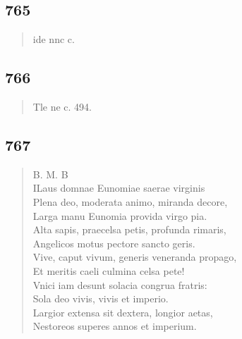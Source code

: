 \documentclass[11pt, a4paper]{report}
\begin{document}
            \subsection*{765}
      \begin{verse}
      ide nnc c. \\ 
      \end{verse}
  
            \subsection*{766}
      \begin{verse}
      Tle ne c. 494. \\ 
      \end{verse}
  
            \subsection*{767}
      \begin{verse}
      B. M. B \\ ILaus domnae Eunomiae saerae virginis \\ Plena deo, moderata animo, miranda decore, \\ Larga manu Eunomia provida virgo pia. \\ Alta sapis, praecelsa petis, profunda rimaris, \\ Angelicos motus pectore sancto geris. \\ Vive, caput vivum, generis veneranda propago, \\ Et meritis caeli culmina celsa pete! \\ Vnici iam desunt solacia congrua fratris: \\ Sola deo vivis, vivis et imperio. \\ Largior extensa sit dextera, longior aetas, \\ Nestoreos superes annos et imperium. \\ 
      \end{verse}
  
\end{document}
